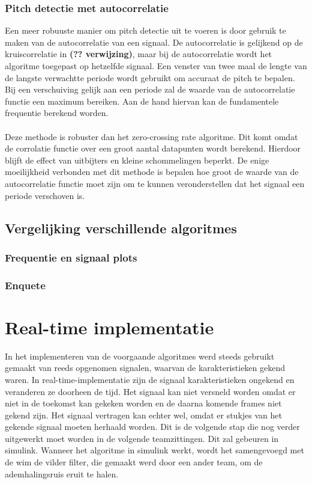 \documentclass[12pt]{report}
\begin{document}
\subsection{Pitch detectie met autocorrelatie}
Een meer robuuste manier om pitch detectie uit te voeren is door gebruik te maken van de autocorrelatie van een signaal. De autocorrelatie is gelijkend op de kruiscorrelatie in \textbf{(?? verwijzing)}, maar bij de autocorrelatie wordt het algoritme toegepast op hetzelfde signaal. 
Een venster van twee maal de lengte van de langste verwachtte periode wordt  gebruikt om accuraat de pitch te bepalen. Bij een verschuiving gelijk aan een periode zal de waarde van de autocorrelatie functie een maximum bereiken. Aan de hand hiervan kan de fundamentele frequentie berekend worden.\\
\\
Deze methode is robuster dan het zero-crossing rate algoritme. Dit komt omdat de corrolatie functie over een groot aantal datapunten wordt berekend. Hierdoor blijft de effect van uitbijters en kleine schommelingen beperkt. De enige moeilijkheid verbonden met dit methode is bepalen hoe groot de waarde van de autocorrelatie functie moet zijn om te kunnen veronderstellen dat het signaal een periode verschoven is.



\section{Vergelijking verschillende algoritmes}
\subsection{Frequentie en signaal plots}
\subsection{Enquete}



\chapter{Real-time implementatie}
In het implementeren van de voorgaande algoritmes werd steeds gebruikt gemaakt van reeds opgenomen signalen, waarvan de karakteristieken gekend waren. In real-time-implementatie zijn de signaal karakteristieken ongekend en veranderen ze doorheen de tijd. Het signaal kan niet versneld worden omdat er niet in de toekomst kan gekeken worden en de daarna komende frames niet gekend zijn. Het signaal vertragen kan echter wel, omdat er stukjes van het gekende signaal moeten herhaald worden. Dit is de volgende stap die nog verder uitgewerkt moet worden in de volgende teamzittingen. Dit zal gebeuren in simulink. Wanneer het algoritme in simulink werkt, wordt het samengevoegd met de wim de vilder filter, die gemaakt werd door een ander team, om de ademhalingsruis eruit te halen.
\end{document}
